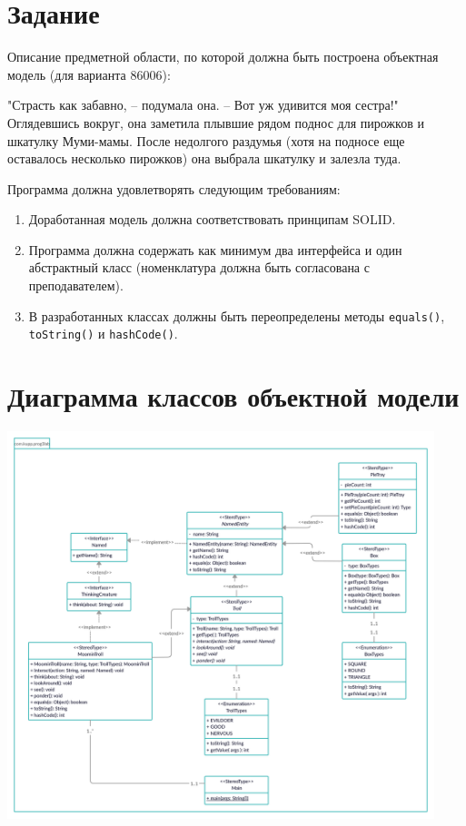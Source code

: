 \documentclass[11pt]{article}
\begin{document}
\section{Задание}
Описание предметной области, по которой должна быть построена объектная модель (для варианта 86006):
\begin{displayquote}
	"Страсть как забавно, -- подумала она. -- Вот уж удивится моя сестра!" Оглядевшись вокруг, она заметила плывшие рядом поднос для пирожков и шкатулку Муми-мамы. После недолгого раздумья (хотя на подносе еще оставалось несколько пирожков) она выбрала шкатулку и залезла туда.
\end{displayquote}
Программа должна удовлетворять следующим требованиям:
\begin{enumerate}
	\item Доработанная модель должна соответствовать принципам SOLID.
	\item Программа должна содержать как минимум два интерфейса и один абстрактный класс (номенклатура должна быть согласована с преподавателем).
	\item В разработанных классах должны быть переопределены методы \texttt{equals()},\texttt{ toString()} и \texttt{hashCode()}.
\pagebreak
\end{enumerate}
\section{Диаграмма классов объектной модели}
\includegraphics[width=470px]{../prog3lab class diagram.png}
\pagebreak
\end{document}
